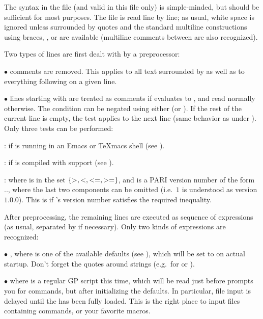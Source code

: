  The syntax in the  file (and valid in this file
only) is simple-minded, but should be sufficient for most purposes. The file
is read line by line; as usual, white space is ignored unless surrounded by
quotes and the standard multiline constructions using braces, \kbd{\bs}, or
\kbd{=} are available (multiline comments between \kbd{/*~\dots~*/} are also
recognized).

Two types of lines are first dealt with by a preprocessor:

$\bullet$ comments are removed. This applies to all text surrounded by
\kbd{/*~\dots~*/} as well as to everything following \kbd{\bs\bs} on a given
line.

$\bullet$ lines starting with   are treated as
comments if  evaluates to , and read normally
otherwise. The condition can be negated using either  (or
). If the rest of the current line is empty, the test applies to
the next line (same behavior as \kbd{=} under ). Only three tests can be
performed:

:  if  is running in an Emacs or TeXmacs shell (see
).

:  if  is compiled with  support (see
).

  : where  is in the set
$\{ {\tt >}, {\tt <}, {\tt <=}, {\tt >=} \}$, and  is a PARI
version number of the form .., where the
last two components can be omitted (i.e.~$1$ is understood as version $1.0.0$).
This is  if 's version number satisfies the required
inequality.

After preprocessing, the remaining lines are executed as
sequence of expressions (as usual, separated by \kbd{;} if necessary). Only
two kinds of expressions are recognized:

$\bullet$  \kbd{=} , where  is one of
the available defaults (see ), which will be set to
 on actual startup. Don't forget the quotes around strings
(e.g.~for  or ).

$\bullet$  where 
is a regular GP script this time, which will be read just before  prompts
you for commands, but after initializing the defaults. In particular, file
input is delayed until the  has been fully loaded. This is the
right place to input files containing  commands, or your favorite
macros.

